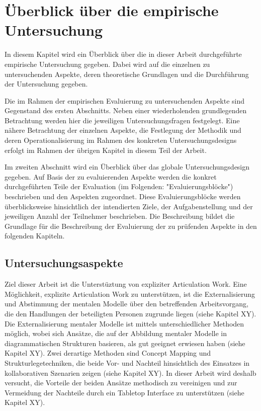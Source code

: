 \chapter{Überblick über die empirische Untersuchung}
\label{cha:eval_ueberblick}

In diesem Kapitel wird ein Überblick über die in dieser Arbeit durchgeführte empirische Untersuchung gegeben. Dabei wird auf die einzelnen zu untersuchenden Aspekte, deren theoretische Grundlagen und die Durchführung der Untersuchung gegeben.

Die im Rahmen der empirischen Evaluierung zu untersuchenden Aspekte sind Gegenstand des ersten Abschnitts. Neben einer wiederholenden grundlegenden Betrachtung werden hier die jeweiligen Untersuchungsfragen festgelegt. Eine nähere Betrachtung der einzelnen Aspekte, die Festlegung der Methodik und deren Operationalisierung im Rahmen des konkreten Untersuchungsdesigns erfolgt im Rahmen der übrigen Kapitel in diesem Teil der Arbeit.

Im zweiten Abschnitt wird ein Überblick über das globale Untersuchungsdesign gegeben. Auf Basis der zu evaluierenden Aspekte werden die konkret durchgeführten Teile der Evaluation (im Folgenden: "Evaluierungsblöcke") beschrieben und den Aspekten zugeordnet. Diese Evaluierungsblöcke werden überblicksweise hinsichtlich der intendierten Ziele, der Aufgabenstellung und der jeweiligen Anzahl der Teilnehmer beschrieben. Die Beschreibung bildet die Grundlage für die Beschreibung der Evaluierung der zu prüfenden Aspekte in den folgenden Kapiteln.

\section{Untersuchungsaspekte} %
\label{sec:untersuchungsaspekte}

Ziel dieser Arbeit ist die Unterstüztung von expliziter Articulation Work. Eine Möglichkeit, explizite Articulation Work zu unterstützen, ist die Externalisierung und Abstimmung der mentalen Modelle über den betreffenden Arbeitsvorgang, die den Handlungen der beteiligten Personen zugrunde liegen (siehe Kapitel XY). Die Externalisierung mentaler Modelle ist mittels unterschiedlicher Methoden möglich, wobei sich Ansätze, die auf der Abbildung mentaler Modelle in diagrammatischen Strukturen basieren, als gut geeignet erwiesen haben (siehe Kapitel XY). Zwei derartige Methoden sind Concept Mapping und Strukturlegetechniken, die beide Vor- und Nachteil hinsichtlich des Einsatzes in kollaborativen Szenarien zeigen (siehe Kapitel XY). In dieser Arbeit wird deshalb versucht, die Vorteile der beiden Ansätze methodisch zu vereinigen und zur Vermeidung der Nachteile durch ein Tabletop Interface zu unterstützen (siehe Kapitel XY).

